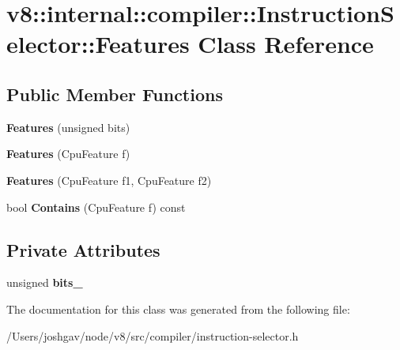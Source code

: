 \hypertarget{classv8_1_1internal_1_1compiler_1_1_instruction_selector_1_1_features}{}\section{v8\+:\+:internal\+:\+:compiler\+:\+:Instruction\+Selector\+:\+:Features Class Reference}
\label{classv8_1_1internal_1_1compiler_1_1_instruction_selector_1_1_features}
\subsection*{Public Member Functions}
\begin{DoxyCompactItemize}
\item 
{\bfseries Features} (unsigned bits)\hypertarget{classv8_1_1internal_1_1compiler_1_1_instruction_selector_1_1_features_aad9cc690435e56da584c6ba055365eca}{}\label{classv8_1_1internal_1_1compiler_1_1_instruction_selector_1_1_features_aad9cc690435e56da584c6ba055365eca}

\item 
{\bfseries Features} (Cpu\+Feature f)\hypertarget{classv8_1_1internal_1_1compiler_1_1_instruction_selector_1_1_features_a54ec4e5b3c11c2371b2fa0ef18246395}{}\label{classv8_1_1internal_1_1compiler_1_1_instruction_selector_1_1_features_a54ec4e5b3c11c2371b2fa0ef18246395}

\item 
{\bfseries Features} (Cpu\+Feature f1, Cpu\+Feature f2)\hypertarget{classv8_1_1internal_1_1compiler_1_1_instruction_selector_1_1_features_a1052c980dbbaf5b35057288d2d4f7bc8}{}\label{classv8_1_1internal_1_1compiler_1_1_instruction_selector_1_1_features_a1052c980dbbaf5b35057288d2d4f7bc8}

\item 
bool {\bfseries Contains} (Cpu\+Feature f) const \hypertarget{classv8_1_1internal_1_1compiler_1_1_instruction_selector_1_1_features_a44e65d5234d7e1cdc03d6279d3c31be6}{}\label{classv8_1_1internal_1_1compiler_1_1_instruction_selector_1_1_features_a44e65d5234d7e1cdc03d6279d3c31be6}

\end{DoxyCompactItemize}
\subsection*{Private Attributes}
\begin{DoxyCompactItemize}
\item 
unsigned {\bfseries bits\+\_\+}\hypertarget{classv8_1_1internal_1_1compiler_1_1_instruction_selector_1_1_features_a95b437dc0d1d84a8f8df6602b29d6d77}{}\label{classv8_1_1internal_1_1compiler_1_1_instruction_selector_1_1_features_a95b437dc0d1d84a8f8df6602b29d6d77}

\end{DoxyCompactItemize}


The documentation for this class was generated from the following file\+:\begin{DoxyCompactItemize}
\item 
/\+Users/joshgav/node/v8/src/compiler/instruction-\/selector.\+h\end{DoxyCompactItemize}
